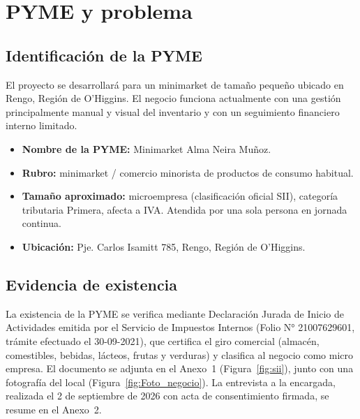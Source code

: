 \documentclass[10pt,a4paper]{article}
\begin{document}


\setcounter{tocdepth}{2}
\thispagestyle{plain}
\tableofcontents
\newpage
\setcounter{page}{1}


\section{PYME y problema}

\subsection{Identificación de la PYME}

El proyecto se desarrollará para un minimarket de tamaño pequeño ubicado en Rengo, Región de O'Higgins. El negocio funciona actualmente con una gestión principalmente manual y visual del inventario y con un seguimiento financiero interno limitado.

\begin{itemize}[leftmargin=*]
    \item \textbf{Nombre de la PYME:} Minimarket Alma Neira Muñoz.
    \item \textbf{Rubro:} minimarket / comercio minorista de productos de consumo habitual.
    \item \textbf{Tamaño aproximado:} microempresa (clasificación oficial SII), categoría tributaria Primera, afecta a IVA. Atendida por una sola persona en jornada continua.
    \item \textbf{Ubicación:} Pje. Carlos Isamitt 785, Rengo, Región de O'Higgins.
\end{itemize}

\subsection{Evidencia de existencia}

La existencia de la PYME se verifica mediante Declaración Jurada de Inicio de Actividades emitida por el Servicio de Impuestos Internos (Folio N° 21007629601, trámite efectuado el 30-09-2021), que certifica el giro comercial (almacén, comestibles, bebidas, lácteos, frutas y verduras) y clasifica al negocio como micro empresa. El documento se adjunta en el Anexo~1 (Figura~\ref{fig:sii}), junto con una fotografía del local (Figura~\ref{fig:Foto_negocio}). La entrevista a la encargada, realizada el 2 de septiembre de 2026 con acta de consentimiento firmada, se resume en el Anexo~2.
\end{document}
